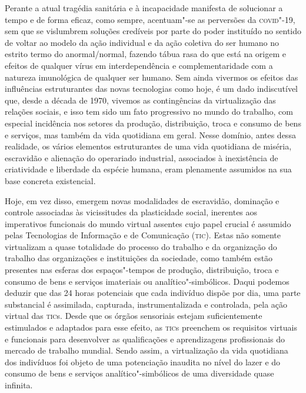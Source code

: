 Perante a atual tragédia sanitária e à incapacidade manifesta de
solucionar a tempo e de forma eficaz, como sempre, acentuam"-se as
perversões da \textsc{covid}"-19, sem que se vislumbrem soluções credíveis por
parte do poder instituído no sentido de voltar ao modelo da ação
individual e da ação coletiva do ser humano no estrito termo do
anormal/normal, fazendo tábua rasa do que está na origem e efeitos de
qualquer vírus em interdependência e complementaridade com a natureza
imunológica de qualquer ser humano. Sem ainda vivermos os efeitos das
influências estruturantes das novas tecnologias como hoje, é um dado
indiscutível que, desde a década de 1970, vivemos as contingências da
virtualização das relações sociais, e isso tem sido um fato progressivo
no mundo do trabalho, com especial incidência nos setores da produção,
distribuição, troca e consumo de bens e serviços, mas também da vida
quotidiana em geral. Nesse domínio, antes dessa realidade, os vários
elementos estruturantes de uma vida quotidiana de miséria, escravidão e
alienação do operariado industrial, associados à inexistência de
criatividade e liberdade da espécie humana, eram plenamente assumidos na
sua base concreta existencial.

Hoje, em vez disso, emergem novas modalidades de escravidão, dominação e
controle associadas às vicissitudes da plasticidade social, inerentes
aos imperativos funcionais do mundo virtual assentes cujo papel crucial
é assumido pelas Tecnologias de Informação e de Comunicação (\textsc{tic}). Estas
não somente virtualizam a quase totalidade do processo do trabalho e da
organização do trabalho das organizações e instituições da sociedade,
como também estão presentes nas esferas dos espaços"-tempos de produção,
distribuição, troca e consumo de bens e serviços imateriais ou
analítico"-simbólicos. Daqui podemos deduzir que das 24 horas potenciais
que cada indivíduo dispõe por dia, uma parte substancial é assimilada,
capturada, instrumentalizada e controlada, pela ação virtual das \textsc{tic}s.
Desde que os órgãos sensoriais estejam suficientemente estimulados e
adaptados para esse efeito, as \textsc{tic}s preenchem os requisitos virtuais e
funcionais para desenvolver as qualificações e aprendizagens
profissionais do mercado de trabalho mundial. Sendo assim, a
virtualização da vida quotidiana dos indivíduos foi objeto de uma
potenciação inaudita no nível do lazer e do consumo de bens e serviços
analítico"-simbólicos de uma diversidade quase infinita.

